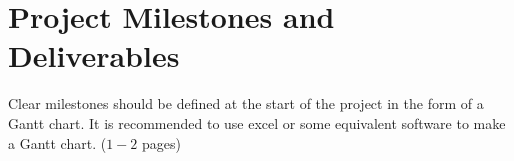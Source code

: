 
\chapter{Project Milestones and Deliverables}
\label{Chapter6}

Clear milestones should be defined at the start of the project in the form of a Gantt chart. It is recommended to use excel or some equivalent software to make a Gantt chart. ($1-2$ pages)